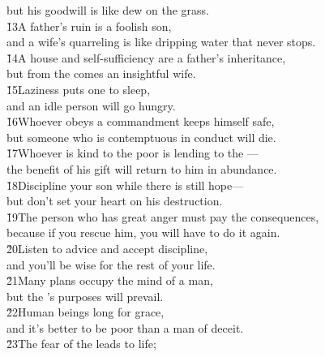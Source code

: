 \begin{poetry}
\poemll    but his goodwill is like dew on the grass. \\
\poeml \v{13}A father's ruin is a foolish son, \\
\poemll    and a wife's quarreling is like dripping water that never stops. \\
\poeml \v{14}A house and self-sufficiency are a father's inheritance, \\
\poemll    but from the  comes an insightful wife. \\
\poeml \v{15}Laziness puts one to sleep, \\
\poemll    and an idle person will go hungry. \\
\poeml \v{16}Whoever obeys a commandment keeps himself safe, \\
\poemll    but someone who is contemptuous in conduct will die. \\
\poeml \v{17}Whoever is kind to the poor is lending to the --- \\
\poemll    the benefit of his gift will return to him in abundance. \\
\poeml \v{18}Discipline your son while there is still hope--- \\
\poemll    but don't set your heart on his destruction. \\
\poeml \v{19}The person who has great anger must pay the consequences, \\
\poemll    because if you rescue him, you will have to do it again. \\
\poeml \v{20}Listen to advice and accept discipline, \\
\poemll    and you'll be wise for the rest of your life. \\
\poeml \v{21}Many plans occupy the mind of a man, \\
\poemll    but the 's purposes will prevail. \\
\poeml \v{22}Human beings long for grace, \\
\poemll    and it's better to be poor than a man of deceit. \\
\poeml \v{23}The fear of the  leads to life; \\

\end{poetry}
